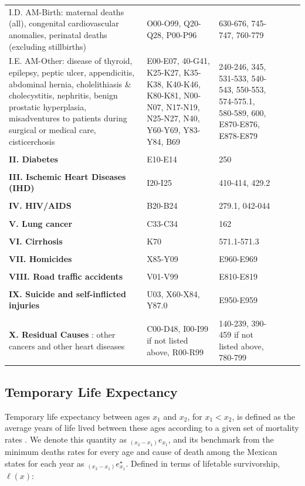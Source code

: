 \documentclass[11.5pt]{article}
\begin{document}
{\begin{longtable}{p{8cm}p{4cm}p{4cm}ccc}
          I.D. AM-Birth: maternal deaths (all), congenital cardiovascular anomalies, perinatal deaths (excluding stillbirths) & O00-O99, Q20-Q28, P00-P96 & 630-676, 745-747, 760-779\\
          I.E. AM-Other: disease of thyroid, epilepsy, peptic ulcer, appendicitis, abdominal hernia, cholelithiasis \& cholecystitis, nephritis, benign prostatic hyperplasia, misadventures to patients during surgical or medical care, cisticerchosis & E00-E07, 40-G41, K25-K27, K35-K38, K40-K46, K80-K81,  N00-N07, N17-N19, N25-N27, N40, Y60-Y69, Y83-Y84, B69 & 240-246, 345, 531-533, 540-543, 550-553, 574-575.1, 580-589, 600, E870-E876, E878-E879\\
 & \\          
 {\bf II. Diabetes}  & E10-E14 & 250 \\      
 & \\
 {\bf III. Ischemic Heart Diseases (IHD)}   & I20-I25 & 410-414, 429.2\\
 & \\           
 {\bf IV. HIV/AIDS} & B20-B24 & 279.1, 042-044\\ 
  & \\                
{\bf V. Lung cancer}  & C33-C34 & 162\\
  & \\          
{\bf VI. Cirrhosis}&  K70 & 571.1-571.3\\
 & \\          
{\bf VII. Homicides}  & X85-Y09 & E960-E969\\     
 & \\           
 {\bf VIII. Road traffic accidents}  & V01-V99 & E810-E819 \\     
 & \\           
{\bf IX. Suicide and self-inflicted injuries}  & U03, X60-X84, Y87.0 & E950-E959\\ 
 & \\          
{\bf X. Residual Causes }:  other cancers and other heart diseases & C00-D48, I00-I99 if not listed above, R00-R99 & 140-239, 390-459 if not listed above, 780-799
\label{ME_Mex}
\end{longtable}



\subsection*{Temporary Life Expectancy}
Temporary life expectancy between ages
$x_1$ and $x_2$, for $x_1<x_2$, is defined as the average years of life lived between these ages according to a given set of mortality rates \citep{arriaga1984}. We denote this quantity as
$_{(x_2-x_1)}e_{x_1}$, and its benchmark from the minimum deaths rates for every age and cause of death among the Mexican states for each year as $_{(x_2-x_1)}e^{\star}_{x_1}$. Defined in
terms of lifetable survivorship, $\ell(x)$:

}
\end{document}
